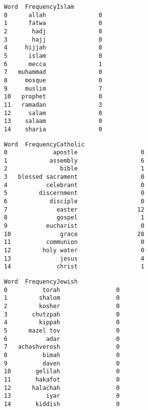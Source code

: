 \documentclass[11pt]{article}
\begin{document}
            \begin{tcolorbox}[breakable, size=fbox, boxrule=.5pt, pad at break*=1mm, opacityfill=0]
\begin{Verbatim}[commandchars=\\\{\}]
        Word  FrequencyIslam
0      allah               0
1      fatwa               0
2       hadj               0
3       hajj               0
4     hijjah               0
5      islam               0
6      mecca               1
7   muhammad               0
8     mosque               0
9     muslim               7
10   prophet               0
11   ramadan               3
12     salam               0
13    salaam               0
14    sharia               0
\end{Verbatim}
\end{tcolorbox}
        
            \begin{tcolorbox}[breakable, size=fbox, boxrule=.5pt, pad at break*=1mm, opacityfill=0]
\begin{Verbatim}[commandchars=\\\{\}]
                 Word  FrequencyCatholic
0             apostle                  0
1            assembly                  6
2               bible                  1
3   blessed sacrament                  0
4           celebrant                  0
5         discernment                  0
6            disciple                  0
7              easter                 12
8              gospel                  1
9           eucharist                  0
10              grace                 28
11          communion                  0
12         holy water                  0
13              jesus                  4
14             christ                  1
\end{Verbatim}
\end{tcolorbox}
        
            \begin{tcolorbox}[breakable, size=fbox, boxrule=.5pt, pad at break*=1mm, opacityfill=0]
\begin{Verbatim}[commandchars=\\\{\}]
            Word  FrequencyJewish
0          torah                0
1         shalom                0
2         kosher                0
3       chutzpah                0
4         kippah                0
5      mazel tov                0
6           adar                0
7   achashverosh                0
8          bimah                0
9          daven                0
10       gelilah                0
11       hakafot                0
12      halachah                0
13          iyar                0
14       kiddish                0
\end{Verbatim}
\end{tcolorbox}
        
\end{document}
